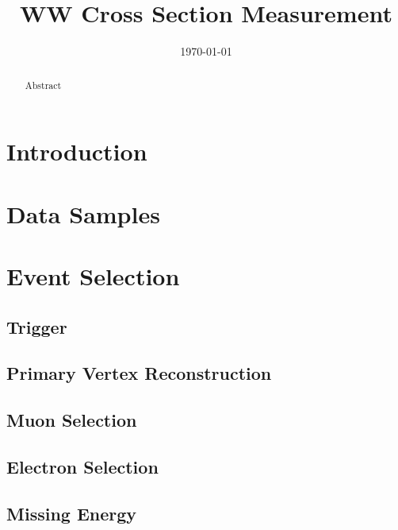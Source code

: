\documentclass{cmspaper}
\begin{document}
\begin{titlepage}


  \date{\today}

  \title{WW Cross Section Measurement}

  

  \begin{abstract}
    Abstract
  \end{abstract} 

\end{titlepage}
\tableofcontents
\newpage 

\section{Introduction}
  \label{sec:overview}
  
\section{Data Samples}
  \label{sec:datasets}
  
\section{Event Selection}
  \label{sec:selection} 
  \subsection{Trigger}
    \label{sec:sel_trigger}
  \subsection{Primary Vertex Reconstruction}
    \label{sec:sel_pv}
  \subsection{Muon Selection} 
    \label{sec:sel_muons}
  \subsection{Electron Selection} 
    \label{sec:sel_electrons}
  \subsection{Missing Energy} 
    \label{sec:sel_met}
    \clearpage
\end{document}
